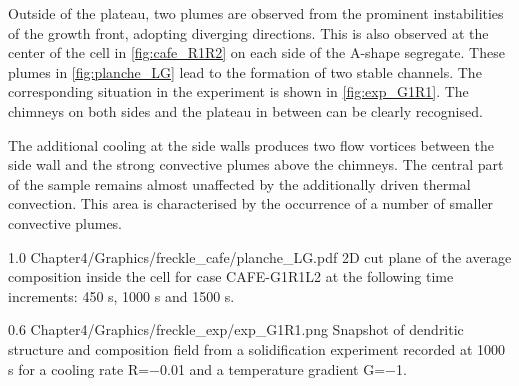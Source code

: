 Outside of the plateau, two plumes are observed from the prominent instabilities of the growth front, adopting diverging directions. 
This is also observed at the center of the cell in \cref{fig:cafe_R1R2} on each side of the A-shape segregate. 
These plumes in \cref{fig:planche_LG} lead to the formation of two stable channels. 
The corresponding situation in the experiment is shown in \cref{fig:exp_G1R1}. The chimneys on both sides and the plateau in between can be clearly 
recognised. 

The additional cooling at the side walls produces two flow vortices between the side wall and the strong convective plumes above the 
chimneys. The central part of the sample remains almost unaffected by the additionally driven thermal convection. This area is characterised by 
the occurrence of a number of smaller convective plumes.  

\begin{figureth}
{1.0}
{Chapter4/Graphics/freckle_cafe/planche_LG.pdf}
{2D cut plane of the average composition inside the cell for case CAFE-G1R1L2 at the 
following time increments: 450 s, 1000 s and 1500 s.}
\label{fig:planche_LG}
\end{figureth}

\begin{figureth}
{0.6}
{Chapter4/Graphics/freckle_exp/exp_G1R1.png}
{Snapshot of dendritic structure and composition field from a 
solidification experiment recorded at 1000 s for a cooling rate R=\SI{-0.01}{\uCR} and a temperature gradient G=\SI{-1}{\ugradT}.}
\label{fig:exp_G1R1}
\end{figureth}

